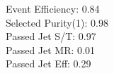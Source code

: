 Event Efficiency:   0.84\\ 
Selected Purity(1): 0.98\\ 
Passed Jet S/T:     0.97\\ 
Passed Jet MR:      0.01\\ 
Passed Jet Eff:     0.29